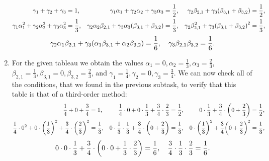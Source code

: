 \documentclass{exercise}
\begin{document}
\begin{enumerate}
{			\begin{align*}
				\gamma_1 + \gamma_2 + \gamma_3 &= 1, & \gamma_1 \alpha_1 + \gamma_2 \alpha_2 + \gamma_3 \alpha_3 &= \frac{1}{2}, & \gamma_2 \beta_{2, 1} + \gamma_3 \parentheses*{\beta_{3, 1} + \beta_{3, 2}} &= \frac{1}{2},\\
				\gamma_1 \alpha_1^2 + \gamma_2 \alpha_2^2 + \gamma_3 \alpha_3^2 &= \frac{1}{3}, & \gamma_2 \alpha_2 \beta_{2, 1} + \gamma_3 \alpha_3 \parentheses*{\beta_{3, 1} + \beta_{3, 2}} &= \frac{1}{3}, & \gamma_2 \beta_{2, 1}^2 + \gamma_3 \parentheses*{\beta_{3, 1} + \beta_{3, 2}}^2 &= \frac{1}{3},
			\end{align*}
			\[
				\gamma_2 \alpha_1 \beta_{2, 1} + \gamma_3 \parentheses*{\alpha_1 \beta_{3, 1} + \alpha_2 \beta_{3, 2}} = \frac{1}{6}, \quad \gamma_3 \beta_{2, 1}\beta_{3, 2} = \frac{1}{6}.
			\]
		}
		\item For the given tableau we obtain the values \(\alpha_1 = 0, \alpha_2 = \frac{1}{3}, \alpha_3 = \frac{2}{3}\), \(\beta_{2, 1} = \frac{1}{3}, \beta_{3, 1} = 0, \beta_{3, 2} = \frac{2}{3}\), and \(\gamma_1 = \frac{1}{4}, \gamma_2 = 0, \gamma_3 = \frac{3}{4}\).
		We can now check all of the conditions, that we found in the previous subtask, to verify that this table is that of a third-order method:
		{
			\setlength{\belowdisplayskip}{5pt}
			\begin{align*}
				\frac{1}{4} + 0 + \frac{3}{4} &= 1, & \frac{1}{4} \cdot 0 + 0 \cdot \frac{1}{3} + \frac{3}{4} \cdot \frac{2}{3} &= \frac{1}{2}, & 0 \cdot \frac{1}{3} + \frac{3}{4} \cdot \parentheses*{0 + \frac{2}{3}} &= \frac{1}{2},\\
				\frac{1}{4} \cdot 0^2 + 0 \cdot \parentheses*{\frac{1}{3}}^2 + \frac{3}{4} \cdot \parentheses*{\frac{2}{3}}^2 &= \frac{1}{3}, & 0 \cdot \frac{1}{3} \cdot \frac{1}{3} + \frac{3}{4} \cdot \parentheses*{0 + \frac{2}{3}} &= \frac{1}{3}, & 0 \cdot \parentheses*{\frac{1}{3}}^2 + \frac{3}{4} \parentheses*{0 + \frac{2}{3}}^2 &= \frac{1}{3},
			\end{align*}
			\[
				0 \cdot 0 \cdot \frac{1}{3} + \frac{3}{4} \cdot \parentheses*{0 \cdot 0 + \frac{1}{3} \cdot \frac{2}{3}} = \frac{1}{6}, \quad \frac{3}{4} \cdot \frac{1}{3} \cdot \frac{2}{3} = \frac{1}{6}.
			\]
		}
	\end{enumerate}



	\section{}
\end{document}
